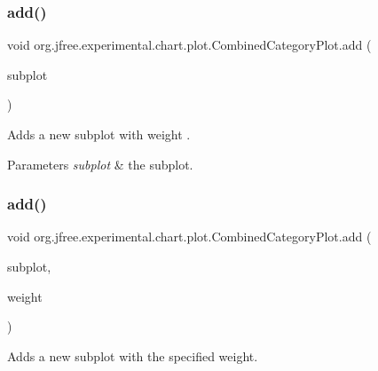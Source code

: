 \subsubsection{\texorpdfstring{add()}{add()}\hspace{0.1cm}{\footnotesize\ttfamily [1/2]}}
{\footnotesize\ttfamily void org.\+jfree.\+experimental.\+chart.\+plot.\+Combined\+Category\+Plot.\+add (\begin{DoxyParamCaption}\item[{\mbox{\hyperlink{classorg_1_1jfree_1_1chart_1_1plot_1_1_category_plot}{Category\+Plot}}}]{subplot }\end{DoxyParamCaption})}

Adds a new subplot with weight {}.


\begin{DoxyParams}{Parameters}
{\em subplot} & the subplot. \\
\hline
\end{DoxyParams}
\mbox{\label{classorg_1_1jfree_1_1experimental_1_1chart_1_1plot_1_1_combined_category_plot_a2c7f54cb0bf115a0b8cb06aac1028962}} 
\subsubsection{\texorpdfstring{add()}{add()}\hspace{0.1cm}{\footnotesize\ttfamily [2/2]}}
{\footnotesize\ttfamily void org.\+jfree.\+experimental.\+chart.\+plot.\+Combined\+Category\+Plot.\+add (\begin{DoxyParamCaption}\item[{\mbox{\hyperlink{classorg_1_1jfree_1_1chart_1_1plot_1_1_category_plot}{Category\+Plot}}}]{subplot,  }\item[{int}]{weight }\end{DoxyParamCaption})}

Adds a new subplot with the specified weight.


